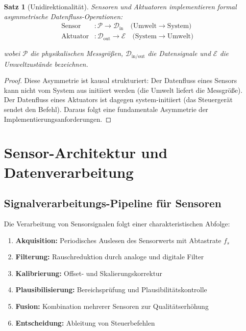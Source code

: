 ﻿\documentclass[a4paper,12pt]{article}
\newtheorem{satz}{Satz}
\begin{document}
\begin{satz}[Unidirektionalität]
Sensoren und Aktuatoren implementieren formal asymmetrische Datenfluss-Operationen:
\begin{align}
	\text{Sensor} &: \mathcal{P} \to \mathcal{D}_{\text{in}} 
	\quad \text{(Umwelt} \to \text{System)} \\
	\text{Aktuator} &: \mathcal{D}_{\text{out}} \to \mathcal{E} 
	\quad \text{(System} \to \text{Umwelt)}
\end{align}

wobei $\mathcal{P}$ die physikalischen Messgrößen, $\mathcal{D}_{\text{in/out}}$ die 
Datensignale und $\mathcal{E}$ die Umweltzustände bezeichnen.
\end{satz}

\begin{proof}
Diese Asymmetrie ist kausal strukturiert: Der Datenfluss eines Sensors kann nicht 
vom System aus initiiert werden (die Umwelt liefert die Messgröße). Der Datenfluss 
eines Aktuators ist dagegen system-initiiert (das Steuergerät sendet den Befehl). 
Daraus folgt eine fundamentale Asymmetrie der Implementierungsanforderungen. 
\end{proof}

\section{Sensor-Architektur und Datenverarbeitung}

\subsection{Signalverarbeitungs-Pipeline für Sensoren}

Die Verarbeitung von Sensorsignalen folgt einer charakteristischen Abfolge:

\begin{enumerate}
	\item \textbf{Akquisition:} Periodisches Auslesen des Sensorwerts mit Abtastrate $f_s$
	\item \textbf{Filterung:} Rauschreduktion durch analoge und digitale Filter
	\item \textbf{Kalibrierung:} Offset- und Skalierungskorrektur
	\item \textbf{Plausibilisierung:} Bereichsprüfung und Plausibilitätskontrolle
	\item \textbf{Fusion:} Kombination mehrerer Sensoren zur Qualitätserhöhung
	\item \textbf{Entscheidung:} Ableitung von Steuerbefehlen
\end{enumerate}
\end{document}
